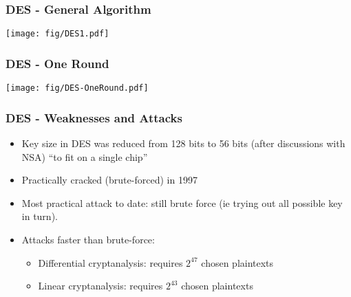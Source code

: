 \documentclass[
hyperref={pdfpagelabels=false}
,xcolor=table
]
{beamer}
\begin{document}
 


\begin{frame}
  \frametitle{DES - General Algorithm}
  \begin{center}
    \texttt{[image: fig/DES1.pdf]}
  \end{center} 
  
\end{frame}

\begin{frame}
  \frametitle{DES - One Round}
  \begin{center}
    \texttt{[image: fig/DES-OneRound.pdf]}
  \end{center} 

\end{frame}


\begin{frame}
  \frametitle{DES - Weaknesses and Attacks}

  \begin{itemize}
  \item Key size in DES was reduced from 128 bits to 56 bits (after discussions with NSA) ``to fit on a single chip''
  \item Practically cracked (brute-forced) in 1997
  \item Most practical attack to date: still brute force (ie trying out all possible key in turn).
  \item Attacks faster than brute-force:
    \begin{itemize}
    \item Differential cryptanalysis: requires $2^{47}$ chosen plaintexts
    \item Linear cryptanalysis: requires $2^{43}$ chosen plaintexts
    \end{itemize}
  \end{itemize}
\end{frame}
\end{document}
